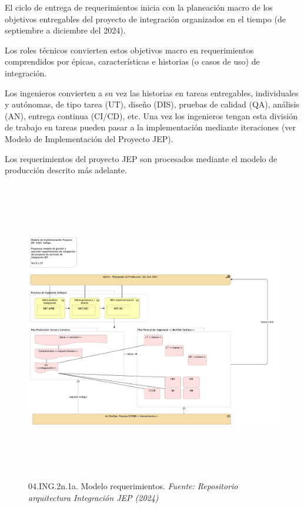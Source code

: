 \documentclass[
  paper=a4,
  ,captions=tableheading
]{scrartcl}
\begin{document}
El ciclo de entrega de requerimientos inicia con la planeación macro de
los objetivos entregables del proyecto de integración organizados en el
tiempo (de septiembre a diciembre del 2024).

Los roles técnicos convierten estos objetivos macro en requerimientos
comprendidos por épicas, características e historias (o casos de uso) de
integración.

Los ingenieros convierten a su vez las historias en tareas entregables,
individuales y autónomas, de tipo tarea (UT), diseño (DIS), pruebas de
calidad (QA), análisis (AN), entrega continua (CI/CD), etc. Una vez los
ingenieros tengan esta división de trabajo en tareas pueden pasar a la
implementación mediante iteraciones (ver Modelo de Implementación del
Proyecto JEP).

Los requerimientos del proyecto JEP son procesados mediante el modelo de
producción descrito más adelante.

\begin{figure}
\centering
\includegraphics[width=\textwidth,height=5.20833in]{images/04.ING.2n.1a.Modelorequerimientos.png}
\caption{04.ING.2n.1a. Modelo requerimientos. \emph{Fuente: Repositorio
arquitectura Integración JEP
(2024)}}\label{fig:id-7c3abdaa8d9b46eebfd8f8e3e8d912ce}
\end{figure}
\end{document}
